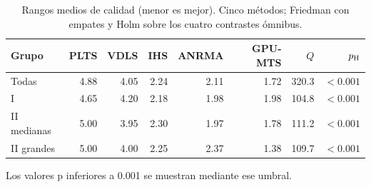 \begin{table}[tbp]\centering\small
\caption{Rangos medios de calidad (menor es mejor). Cinco métodos; Friedman con empates y Holm sobre los cuatro contrastes ómnibus.}
\label{tab:friedman}
\begin{tabular}{lrrrrrrr}
\toprule
Grupo & PLTS & VDLS & IHS & ANRMA & GPU-MTS & $Q$ & $p_{\rm H}$\\
\midrule
Todas & 4.88 & 4.05 & 2.24 & 2.11 & 1.72 & 320.3 & $<0.001$\\
I & 4.65 & 4.20 & 2.18 & 1.98 & 1.98 & 104.8 & $<0.001$\\
II medianas & 5.00 & 3.95 & 2.30 & 1.97 & 1.78 & 111.2 & $<0.001$\\
II grandes & 5.00 & 4.00 & 2.25 & 2.37 & 1.38 & 109.7 & $<0.001$\\
\bottomrule\end{tabular}
\par\smallskip\parbox{.97\linewidth}{\footnotesize Los valores p inferiores a 0.001 se muestran mediante ese umbral.}
\end{table}

